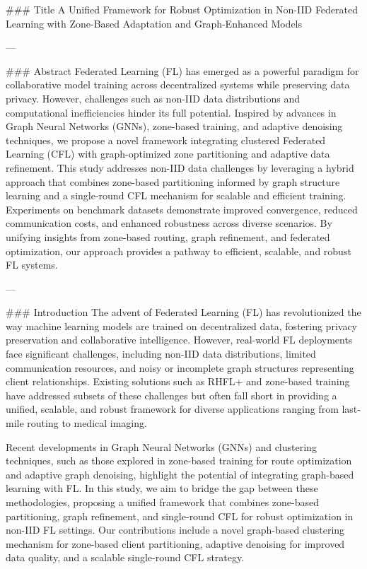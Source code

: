 ### Title
A Unified Framework for Robust Optimization in Non-IID Federated Learning with Zone-Based Adaptation and Graph-Enhanced Models

---

### Abstract
Federated Learning (FL) has emerged as a powerful paradigm for collaborative model training across decentralized systems while preserving data privacy. However, challenges such as non-IID data distributions and computational inefficiencies hinder its full potential. Inspired by advances in Graph Neural Networks (GNNs), zone-based training, and adaptive denoising techniques, we propose a novel framework integrating clustered Federated Learning (CFL) with graph-optimized zone partitioning and adaptive data refinement. This study addresses non-IID data challenges by leveraging a hybrid approach that combines zone-based partitioning informed by graph structure learning and a single-round CFL mechanism for scalable and efficient training. Experiments on benchmark datasets demonstrate improved convergence, reduced communication costs, and enhanced robustness across diverse scenarios. By unifying insights from zone-based routing, graph refinement, and federated optimization, our approach provides a pathway to efficient, scalable, and robust FL systems.

---

### Introduction
The advent of Federated Learning (FL) has revolutionized the way machine learning models are trained on decentralized data, fostering privacy preservation and collaborative intelligence. However, real-world FL deployments face significant challenges, including non-IID data distributions, limited communication resources, and noisy or incomplete graph structures representing client relationships. Existing solutions such as RHFL+ and zone-based training have addressed subsets of these challenges but often fall short in providing a unified, scalable, and robust framework for diverse applications ranging from last-mile routing to medical imaging.

Recent developments in Graph Neural Networks (GNNs) and clustering techniques, such as those explored in zone-based training for route optimization and adaptive graph denoising, highlight the potential of integrating graph-based learning with FL. In this study, we aim to bridge the gap between these methodologies, proposing a unified framework that combines zone-based partitioning, graph refinement, and single-round CFL for robust optimization in non-IID FL settings. Our contributions include a novel graph-based clustering mechanism for zone-based client partitioning, adaptive denoising for improved data quality, and a scalable single-round CFL strategy.

